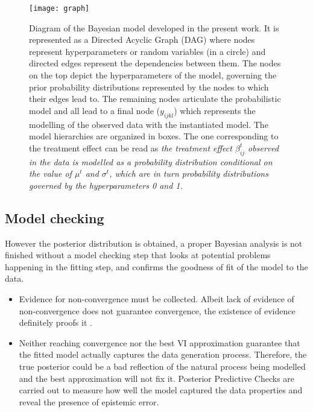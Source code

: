 \begin{figure}[!h]
\centering
\texttt{[image: graph]}
\caption[Bayesian model simplified diagram]{Diagram of the Bayesian model developed in the present work. It is represented as a Directed Acyclic Graph (\ac{DAG}) where nodes represent hyperparameters or random variables (in a circle) and directed edges  represent the dependencies between them. The nodes on the top depict the hyperparameters of the model, governing the prior probability distributions represented by the nodes to which their edges lead to. The remaining nodes articulate the probabilistic model and all lead to a final node ($y_{ijkl}$) which represents the modelling of the observed data with the instantiated model. The model hierarchies are organized in boxes. The one corresponding to the treatment effect can be read as \textit{the treatment effect $\beta_{ij}^{t}$ observed in the data is modelled as a probability distribution conditional on the value of $\mu^t$ and $\sigma^t$, which are in turn probability distributions governed by the hyperparameters 0 and 1.}}
\label{fig:daft_model}
\end{figure}

\subsection{Model checking}
\label{subsec:model_checking}

However the posterior distribution is obtained, a proper Bayesian analysis is not finished without a model checking step that looks at potential problems happening in the fitting step, and confirms the goodness of fit of the model to the data.

\begin{itemize}

\item Evidence for non-convergence must be collected. Albeit lack of evidence of non-convergence does not guarantee convergence, the existence of evidence definitely proofs it \cite{Kruschke}.

\item Neither reaching convergence nor the best \ac{VI} approximation guarantee that the fitted model actually captures the data generation process. Therefore, the true posterior could be a bad reflection of the natural process being modelled and the best approximation will not fix it. Posterior Predictive Checks are carried out to measure how well the model captured the data properties \cite{Kruschke} and reveal the presence of epistemic error.

\end{itemize}




